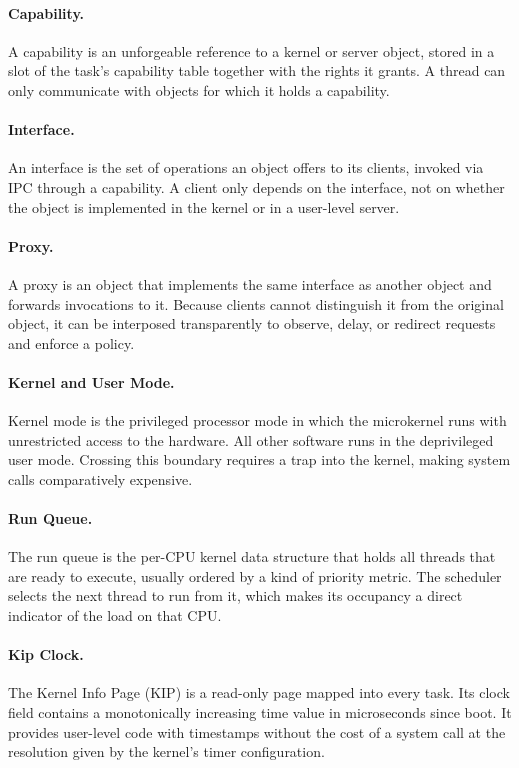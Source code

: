 \paragraph{Capability.}
A capability is an unforgeable reference to a kernel or server object, stored in a slot of the task's capability table together with the rights it grants.
A thread can only communicate with objects for which it holds a capability.

\paragraph{Interface.}
An interface is the set of operations an object offers to its clients, invoked via IPC through a capability.
A client only depends on the interface, not on whether the object is implemented in the kernel or in a user-level server.

\paragraph{Proxy.}
A proxy is an object that implements the same interface as another object and forwards invocations to it.
Because clients cannot distinguish it from the original object, it can be interposed transparently to observe, delay, or redirect requests and enforce a policy.

\paragraph{Kernel and User Mode.}
Kernel mode is the privileged processor mode in which the microkernel runs with unrestricted access to the hardware.
All other software runs in the deprivileged user mode.
Crossing this boundary requires a trap into the kernel, making system calls comparatively expensive.

\paragraph{Run Queue.}
The run queue is the per-CPU kernel data structure that holds all threads that are ready to execute, usually ordered by a kind of priority metric.
The scheduler selects the next thread to run from it, which makes its occupancy a direct indicator of the load on that CPU.

\paragraph{Kip Clock.}
The Kernel Info Page (KIP) is a read-only page mapped into every task.
Its clock field contains a monotonically increasing time value in microseconds since boot.
It provides user-level code with timestamps without the cost of a system call at the resolution given by the kernel's timer configuration.

